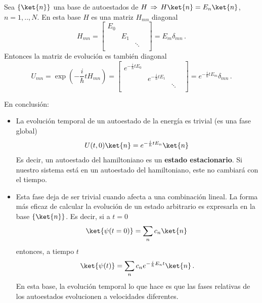 \documentclass[a4paper,11pt]{book} %
\numberwithin{equation}{chapter}
\begin{document}
Sea $\{\ket{n}\}$ una base de autoestados de $H \, \Rightarrow \,H \ket{n} = E_n \ket{n}$, $n=1,..,N$. En esta base $H$ es una matriz $H_{mn}$ diagonal 
	\begin{equation}
	H_{mn} =  \begin{bmatrix} E_0 &  & & \\  & E_1 &  & \\ & & \ddots & \\ & & & \end{bmatrix} =E_m \delta_{mn} \, .
	\end{equation}
Entonces la matriz de evolución es también diagonal 
	\begin{equation}
	U_{mn} = \exp\left(-\frac{i}{\hbar}t H_{mn}\right) = 
 \begin{bmatrix} e^{-\frac{i}{\hbar}t E_0} &  & & \\  & e^{-\frac{i}{\hbar} t E_1}  &  & \\ & & \ddots & \\ & & & \end{bmatrix} = e^{-\frac{i}{\hbar} t  E_m }\delta_{mn} \, .
	\end{equation}

En conclusión:
	\begin{itemize}
	\item La evolución temporal de un autoestado de la energía es trivial (es una fase global)
	\begin{equation}
	U(t,0)\ket{n} = e^{-\frac{i}{\hbar} t E_n} \ket{n}\, 
	\end{equation}
	Es decir, un autoestado del hamiltoniano es un \textbf{estado estacionario}. Si nuestro sistema está en un autoestado del hamiltoniano, este no cambiará con el tiempo.

	\item Esta fase deja de ser trivial cuando afecta a una combinación lineal. La forma más eficaz de calcular la evolución de un estado arbitrario es expresarla en la base $\{\ket{n}\}$. Es decir, si a $t=0$
	\begin{equation}
	\ket{\psi(t=0)} = \sum_n c_n \ket{n} \, 
	\end{equation}
entonces, a tiempo $t$ 
	\begin{equation}
	\ket{\psi(t)} = \sum_n c_n e^{-\frac{i}{\hbar}E_nt} \ket{n} \, .
	\end{equation}
En esta base, la evolución temporal lo que hace es que las fases relativas de los autoestados evolucionen a velocidades diferentes.

	\end{itemize}
\end{document}
